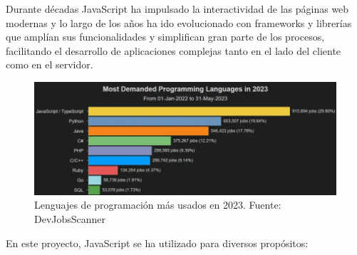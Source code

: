\documentclass[a4paper, 12pt]{book}
\begin{document}
Durante décadas JavaScript ha impulsado la interactividad de las páginas web modernas y lo largo de los años ha ido evolucionado con frameworks y librerías que amplían sus funcionalidades y simplifican gran parte de los procesos, facilitando el desarrollo de aplicaciones complejas tanto en el lado del cliente como en el servidor.

\begin{figure}[H]
    \centering
    \includegraphics[width=\linewidth]{img/prog_languages_popularity.png}
    \caption{Lenguajes de programación más usados en 2023. Fuente: DevJobsScanner}
    \label{fig:prog-languages}
\end{figure}
En este proyecto, JavaScript se ha utilizado para diversos propósitos:
\end{document}
